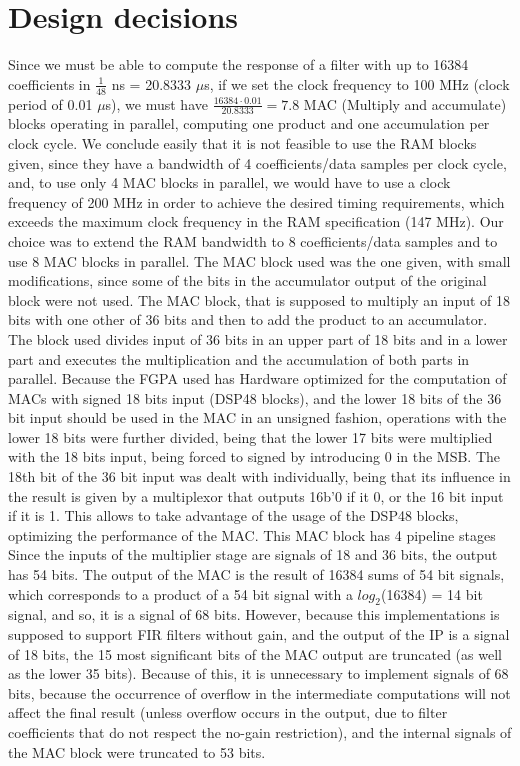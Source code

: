 \documentclass[12pt]{article}
\begin{document}
\section{Design decisions}
Since we must be able to compute the response of a filter with up to 16384 coefficients in
$\frac{1}{48}$ ns = 20.8333 $\mu$s, if we set the clock frequency to 100 MHz (clock period of 0.01
$\mu$s), we must have $\frac{16384\cdot0.01}{20.8333} = 7.8$ MAC (Multiply and accumulate) blocks
operating in parallel, computing one product and one accumulation per clock cycle. We conclude
easily that it is not feasible to use the RAM blocks given, since they have a bandwidth of 4
coefficients/data samples per clock cycle, and, to use only 4 MAC blocks in parallel, we would have
to use a clock frequency of 200 MHz in order to achieve the desired timing requirements, which
exceeds the maximum clock frequency in the RAM specification (147 MHz). Our choice was to extend the
RAM bandwidth to 8 coefficients/data samples and to use 8 MAC blocks in parallel. The MAC block used
was the one given, with small modifications, since some of the bits in the accumulator output of the
original block were not used. The MAC block, that is supposed to multiply an input of 18 bits with
one other of 36 bits and then to add the product to an accumulator. The block used divides input of
36 bits in an upper part of 18 bits and in a lower part and executes the multiplication and the
accumulation of both parts in parallel. Because the FGPA used has Hardware optimized for the
computation of MACs with signed 18 bits input (DSP48 blocks), and the lower 18 bits of the 36 bit
input should be used in the MAC in an unsigned fashion, operations with the lower 18 bits were
further divided, being that the lower 17 bits were multiplied with the 18 bits input, being forced
to signed by introducing 0 in the MSB. The 18th bit of the 36 bit input was dealt with individually,
being that its influence in the result is given by a multiplexor that outputs 16b'0 if it 0, or the
16 bit input if it is 1. This allows to take advantage of the usage of the DSP48 blocks, optimizing
the performance of the MAC. This MAC block has 4 pipeline stages Since the inputs of the multiplier
stage are signals of 18 and 36 bits, the output has 54 bits. The output of the MAC is the result of
16384 sums of 54 bit signals, which corresponds to a product of a 54 bit signal with a
$log_2$(16384) = 14 bit signal, and so, it is a signal of 68 bits. However, because this
implementations is supposed to support FIR filters without gain, and the output of the IP is a
signal of 18 bits, the 15 most significant bits of the MAC output are truncated (as well as the
lower 35 bits). Because of this, it is unnecessary to implement signals of 68 bits, because the
occurrence of overflow in the intermediate computations will not affect the final result (unless
overflow occurs in the output, due to filter coefficients that do not respect the no-gain
restriction), and the internal signals of the MAC block were truncated to 53 bits.
\end{document}
